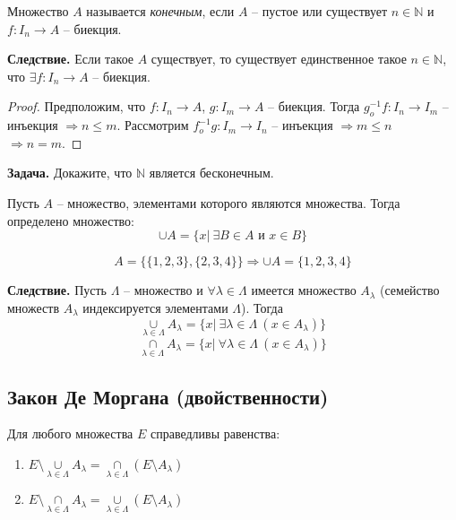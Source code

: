     \begin{definition}
        Множество $A$ называется \textit{конечным}, если $A$ -- пустое или существует $n \in \mathds{N}$ и $f: I_{n} \longrightarrow A$ -- биекция.
    \end{definition}
    
    \textbf{Следствие.} Если такое $A$ существует, то существует единственное такое $n \in \mathds{N}$, что $\exists f: I_{n} \longrightarrow A$ -- биекция.
    
    \begin{proof}
        Предположим, что $f: I_{n} \longrightarrow A$, $g: I_{m} \longrightarrow A$ -- биекция. Тогда $g^{-1}_{o}f: I_{n} \longrightarrow I_{m}$ -- инъекция $\Rightarrow n \leq m$. Рассмотрим $f^{-1}_{o}g: I_{m} \longrightarrow I_{n}$ -- инъекция $\Rightarrow m \leq n$
        \\
        $\Rightarrow n = m$.
    \end{proof}
    
    \textbf{Задача.} Докажите, что $\mathds{N}$ является бесконечным.
    
    \begin{definition}
        Пусть $A$ -- множество, элементами которого являются множества. Тогда определено множество:
        \[\cup A = \{x| \ \exists B \in A \text{ и } x \in B\}\]
    \end{definition}
    
    \begin{example}
        \[A = \{\{1,2,3\}, \{2,3,4\}\} \Rightarrow \cup A = \{1,2,3,4\}\]
    \end{example}
    
    \textbf{Следствие.} Пусть $\Lambda$ -- множество и $\forall \lambda \in \Lambda$ имеется множество $A_{\lambda}$ (семейство множеств $A_{\lambda}$ индексируется элементами $\Lambda$). Тогда 
    \[\overset{}{\underset{\lambda \in \Lambda}{\cup}A_{\lambda}} = \{x| \  \exists \lambda \in \Lambda \ (x \in A_{\lambda})\}\]
    \[\overset{}{\underset{\lambda \in \Lambda}{\cap}A_{\lambda}} = \{x| \  \forall \lambda \in \Lambda \ (x \in A_{\lambda})\}\]
    
\subsection{Закон Де Моргана (двойственности)}
    
    \begin{theorem}
        Для любого множества $E$ справедливы равенства:
        \begin{enumerate}[label={(\alph*)}]
            \item $E \setminus \overset{}{\underset{\lambda \in \Lambda}{\cup}A_{\lambda}} = \overset{}{\underset{\lambda \in \Lambda}{\cap}}(E \setminus A_{\lambda})$ 
            \item $E \setminus \overset{}{\underset{\lambda \in \Lambda}{\cap}A_{\lambda}} = \overset{}{\underset{\lambda \in \Lambda}{\cup}}(E \setminus A_{\lambda})$ 
        \end{enumerate}
    \end{theorem}
    
